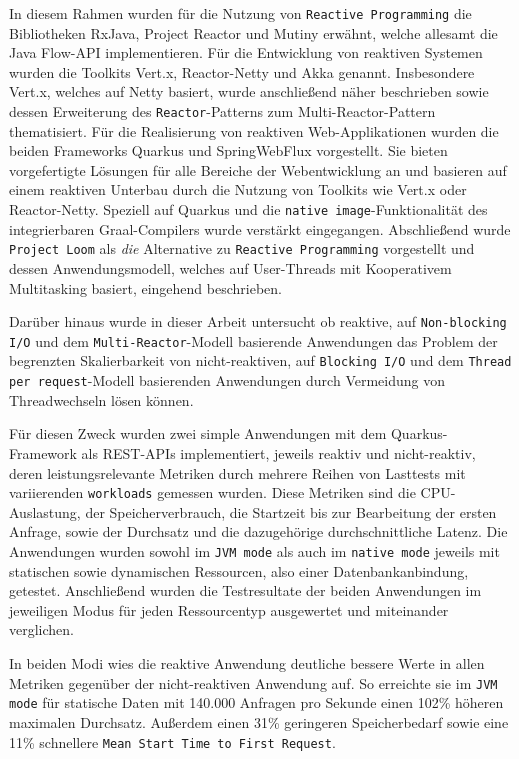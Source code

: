 In diesem Rahmen wurden für die Nutzung von \verb|Reactive Programming| die Bibliotheken RxJava, Project Reactor und Mutiny erwähnt, welche
allesamt die Java Flow-API implementieren. Für die Entwicklung von reaktiven Systemen wurden die Toolkits Vert.x, Reactor-Netty und Akka
genannt. Insbesondere Vert.x, welches auf Netty basiert, wurde anschließend näher beschrieben sowie dessen Erweiterung des \verb|Reactor|-Patterns
zum Multi-Reactor-Pattern thematisiert. Für die Realisierung von reaktiven Web-Applikationen wurden die beiden Frameworks Quarkus und
SpringWebFlux vorgestellt.
Sie bieten vorgefertigte Lösungen für alle Bereiche der Webentwicklung an und basieren auf einem reaktiven Unterbau durch die Nutzung
von Toolkits wie Vert.x oder Reactor-Netty. Speziell auf Quarkus und die \verb|native image|-Funktionalität des integrierbaren Graal-Compilers
wurde verstärkt eingegangen.
Abschließend wurde \verb|Project Loom| als \textit{die} Alternative zu \verb|Reactive Programming| vorgestellt und dessen Anwendungsmodell, welches
auf User-Threads mit Kooperativem Multitasking basiert, eingehend beschrieben.\newline

Darüber hinaus wurde in dieser Arbeit untersucht ob reaktive, auf \verb|Non-blocking I/O| und dem \verb|Multi-Reactor|-Modell basierende
Anwendungen das Problem der begrenzten Skalierbarkeit von nicht-reaktiven, auf \verb|Blocking I/O| und dem \verb|Thread per request|-Modell
basierenden Anwendungen durch Vermeidung von Threadwechseln lösen können.

Für diesen Zweck wurden zwei simple Anwendungen mit dem Quarkus-Framework als REST-APIs implementiert, jeweils reaktiv und nicht-reaktiv, deren
leistungsrelevante Metriken durch mehrere Reihen von Lasttests mit variierenden \verb|workloads| gemessen wurden.
Diese Metriken sind die CPU-Auslastung, der Speicherverbrauch, die Startzeit bis zur Bearbeitung der ersten Anfrage,
sowie der Durchsatz und die dazugehörige durchschnittliche Latenz.
Die Anwendungen wurden sowohl im \verb|JVM mode| als auch im \verb|native mode| jeweils mit statischen sowie dynamischen
Ressourcen, also einer Datenbankanbindung, getestet.
Anschließend wurden die Testresultate der beiden Anwendungen im jeweiligen Modus für jeden Ressourcentyp ausgewertet und
miteinander verglichen.\newline

In beiden Modi wies die reaktive Anwendung deutliche bessere Werte in allen Metriken gegenüber der nicht-reaktiven Anwendung auf.
So erreichte sie im \verb|JVM mode| für statische Daten mit 140.000 Anfragen pro Sekunde einen 102\% höheren maximalen Durchsatz.
Außerdem einen 31\% geringeren Speicherbedarf sowie eine 11\% schnellere \verb|Mean Start Time to First Request|.

